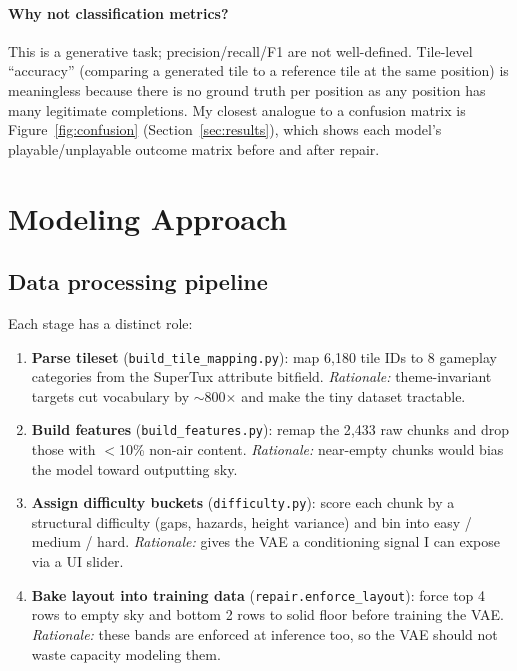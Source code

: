 \documentclass[11pt]{article}
\begin{document}
\paragraph{Why not classification metrics?}
This is a generative task; precision/recall/F1 are not well-defined.
Tile-level ``accuracy'' (comparing a generated tile to a reference
tile at the same position) is meaningless because there is no ground
truth per position as any position has many legitimate completions.
My closest analogue to a confusion matrix is
Figure~\ref{fig:confusion} (Section~\ref{sec:results}), which shows
each model's playable/unplayable outcome matrix before and after
repair.

\section{Modeling Approach}
\label{sec:models}

\subsection{Data processing pipeline}
Each stage has a distinct role:
\begin{enumerate}
    \item \textbf{Parse tileset} (\texttt{build\_tile\_mapping.py}):
    map 6{,}180 tile IDs to 8 gameplay categories from the SuperTux
    attribute bitfield. \emph{Rationale:} theme-invariant targets cut
    vocabulary by $\sim$800$\times$ and make the tiny dataset tractable.
    \item \textbf{Build features} (\texttt{build\_features.py}):
    remap the 2{,}433 raw chunks and drop those with $<$10\% non-air
    content. \emph{Rationale:} near-empty chunks would bias the model
    toward outputting sky.
    \item \textbf{Assign difficulty buckets} (\texttt{difficulty.py}):
    score each chunk by a structural difficulty (gaps,
    hazards, height variance) and bin into easy / medium /
    hard. \emph{Rationale:} gives the VAE a conditioning signal I
    can expose via a UI slider.
    \item \textbf{Bake layout into training data}
    (\texttt{repair.enforce\_layout}): force top 4 rows to empty sky
    and bottom 2 rows to solid floor before training the VAE.
    \emph{Rationale:} these bands are enforced at inference too, so
    the VAE should not waste capacity modeling them.
\end{enumerate}
\end{document}
